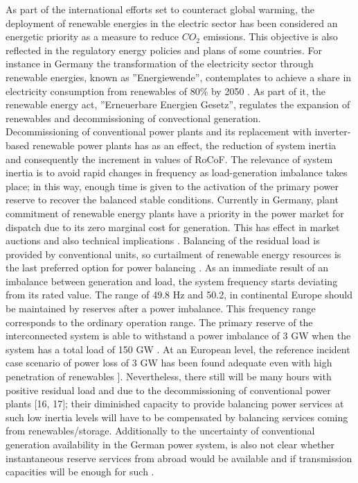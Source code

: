 As part of the international efforts set to counteract global warming, the deployment of renewable energies in the electric sector has been considered an energetic priority as a measure to reduce $CO_{2}$ emissions. This objective is also reflected in the regulatory energy policies and plans of some countries. For instance in Germany the transformation of the electricity sector through renewable energies, known as ''Energiewende”, contemplates to achieve a share in electricity consumption from renewables of 80\% by 2050 \cite{AgoraEnergiewende.}. As part of it, the renewable energy act, ''Erneuerbare Energien Gesetz”, regulates the expansion of renewables and decommissioning of convectional generation.\\

Decommissioning of conventional power plants and its replacement with inverter-based renewable power plants has as an effect, the reduction of system inertia and consequently the increment in values of RoCoF. The relevance of system inertia is to avoid rapid changes in frequency as load-generation imbalance takes place; in this way, enough time is given to the activation of the primary power reserve to recover the balanced stable conditions. Currently in Germany, plant commitment of renewable energy plants have a priority in the power market for dispatch due to its zero marginal cost for generation. This has effect in market auctions and also technical implications \cite{energiewende2017flexibility}. Balancing of the residual load is provided by conventional units, so curtailment of renewable energy resources is the last preferred option for power balancing \cite{dena2014}. As an immediate result of an imbalance between generation and load, the system frequency starts deviating from its rated value. The range of 49.8 Hz and 50.2, in continental Europe should be maintained by reserves after a power imbalance. This frequency range corresponds to the ordinary operation range. The primary reserve of the interconnected system is able to withstand a power imbalance of 3 GW when the system has a total load of 150 GW \cite{ENTSOE.2016}. At an European level, the reference incident case scenario of power loss of 3 GW has been found adequate even with high penetration of renewables \cite{ENTSOE.2016, dena2014}]. Nevertheless, there still will be  many hours with positive residual load and due to the decommissioning of conventional power plants [16, 17]; their diminished capacity to provide balancing power services at such low inertia levels will have to be compensated by balancing services coming from renewables/storage. Additionally to the uncertainty of conventional generation availability in the German power system, is also not clear whether instantaneous reserve services from abroad would be available and if transmission capacities will be enough for such \cite{dena2014}.\\

